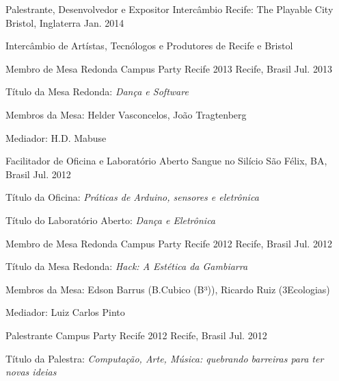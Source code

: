 \begin{cventries}
\cventry
	{Palestrante, Desenvolvedor e Expositor}
	{Intercâmbio Recife: The Playable City}
	{Bristol, Inglaterra}
	{Jan. 2014}
	{\begin{cvitems}
		\item{Intercâmbio de Artístas, Tecnólogos e Produtores de Recife e Bristol}
	\end{cvitems}}

\cventry
	{Membro de Mesa Redonda}
	{Campus Party Recife 2013}
	{Recife, Brasil}
	{Jul. 2013}
	{\begin{cvitems}
		\item{Título da Mesa Redonda: \textit{Dança e Software}}
		\item{Membros da Mesa: Helder Vasconcelos, João Tragtenberg}
		\item{Mediador: H.D. Mabuse}
	\end{cvitems}}

\cventry
	{Facilitador de Oficina e Laboratório Aberto}
	{Sangue no Silício}
	{São Félix, BA, Brasil}
	{Jul. 2012}
	{\begin{cvitems}
		\item{Título da Oficina: \textit{Práticas de Arduino, sensores e eletrônica}}
		\item{Título do Laboratório Aberto: \textit{Dança e Eletrônica}}
	\end{cvitems}}

\cventry
	{Membro de Mesa Redonda}
	{Campus Party Recife 2012}
	{Recife, Brasil}
	{Jul. 2012}
	{\begin{cvitems}
		\item{Título da Mesa Redonda: \textit{Hack: A Estética da Gambiarra}}
		\item{Membros da Mesa: Edson Barrus (B.Cubico (B³)), Ricardo Ruiz (3Ecologias)}
		\item{Mediador: Luiz Carlos Pinto}
	\end{cvitems}}

\cventry
	{Palestrante}
	{Campus Party Recife 2012}
	{Recife, Brasil}
	{Jul. 2012}
	{\begin{cvitems}
		\item{Título da Palestra: \textit{Computação, Arte, Música: quebrando barreiras para ter novas ideias}}
	\end{cvitems}}


\end{cventries}

